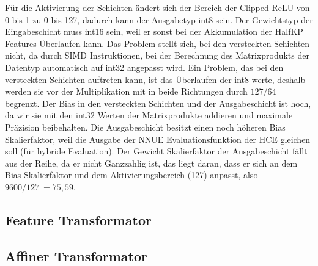 Für die Aktivierung der Schichten ändert sich der Bereich der Clipped \ac{ReLU} von 0 bis 1 zu 0 bis 127, dadurch kann der Ausgabetyp int8 sein. Der Gewichtstyp der Eingabeschicht muss int16 sein, weil er sonst bei der Akkumulation der HalfKP Features Überlaufen kann. Das Problem stellt sich, bei den versteckten Schichten nicht, da durch \ac{SIMD} Instruktionen, bei der Berechnung des Matrixprodukts der Datentyp automatisch auf int32 angepasst wird. Ein Problem, das bei den versteckten Schichten auftreten kann, ist das Überlaufen der int8 werte, deshalb werden sie vor der Multiplikation mit in beide Richtungen durch $127/64$ begrenzt. Der Bias in den versteckten Schichten und der Ausgabeschicht ist hoch, da wir sie mit den int32 Werten der Matrixprodukte addieren und maximale Präzision beibehalten. Die Ausgabeschicht besitzt einen noch höheren Bias Skalierfaktor, weil die Ausgabe der \ac{NNUE} Evaluationsfunktion der \ac{HCE} gleichen soll (für hybride Evaluation). Der Gewicht Skalierfaktor der Ausgabeschicht fällt aus der Reihe, da er nicht Ganzzahlig ist, das liegt daran, dass er sich an dem Bias Skalierfaktor und dem Aktivierungsbereich (127) anpasst, also $9600/127~=75,59$.

\subsection{Feature Transformator}


\subsection{Affiner Transformator}
